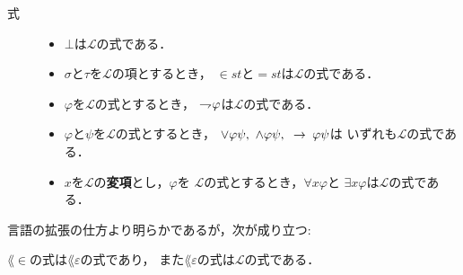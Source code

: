	\begin{description}
		\item[式] 
			\begin{itemize}
				\item $\bot$は$\mathcal{L}$の式である．
				\item $\sigma$と$\tau$を$\mathcal{L}$の項とするとき，
					$\in st$と$=st$は$\mathcal{L}$の式である．
				\item $\varphi$を$\mathcal{L}$の式とするとき，
					$\rightharpoondown\hspace{-0.25em} \varphi$は$\mathcal{L}$の式である．
				\item $\varphi$と$\psi$を$\mathcal{L}$の式とするとき，
					$\vee \varphi \psi,\ \wedge \varphi \psi,\ \rarrow \varphi \psi$は
					いずれも$\mathcal{L}$の式である．
				\item $x$を$\mathcal{L}$の{\bf 変項}とし，$\varphi$を
					$\mathcal{L}$の式とするとき，$\forall x \varphi$と
					$\exists x \varphi$は$\mathcal{L}$の式である．
			\end{itemize}
	\end{description}
	
	言語の拡張の仕方より明らかであるが，次が成り立つ:
	
	\begin{screen}
		\begin{metathm}
			$\lang{\in}$の式は$\lang{\varepsilon}$の式であり，
			また$\lang{\varepsilon}$の式は$\mathcal{L}$の式である．
		\end{metathm}
	\end{screen}
	

